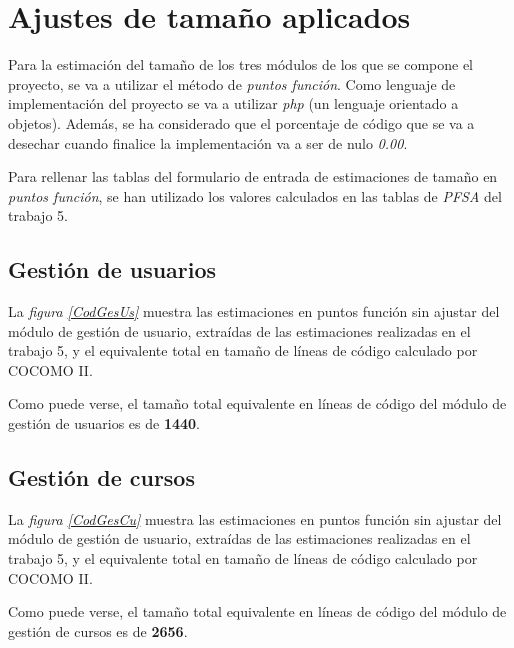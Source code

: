 \documentclass[11pt,a4paper,spanish,twoside]{book}
\begin{document}
\tableofcontents
\listoffigures

\chapter{Ajustes de tamaño aplicados}

Para la estimación del tamaño de los tres módulos de los que se compone el
proyecto, se va a utilizar el método de \emph{puntos función}. Como lenguaje
de implementación del proyecto se va a utilizar \emph{php} (un lenguaje
orientado a objetos). Además, se ha considerado que el porcentaje de código que
se va a desechar cuando finalice la implementación va a ser de nulo
\emph{0.00}.

Para rellenar las tablas del formulario de entrada de estimaciones de tamaño
en \emph{puntos función}, se han utilizado los valores calculados en las tablas
de \emph{PFSA} del trabajo 5.

\section{Gestión de usuarios}
La \emph{figura \ref{CodGesUs}} muestra las estimaciones en puntos función sin
ajustar del módulo de gestión de usuario, extraídas de las estimaciones
realizadas en el trabajo 5, y el equivalente total en tamaño de líneas de
código calculado por COCOMO II.


Como puede verse, el tamaño total equivalente en líneas de código del módulo
de gestión de usuarios es de \textbf{1440}.

\section{Gestión de cursos}
La \emph{figura \ref{CodGesCu}} muestra las estimaciones en puntos función sin
ajustar del módulo de gestión de usuario, extraídas de las estimaciones
realizadas en el trabajo 5, y el equivalente total en tamaño de líneas de
código calculado por COCOMO II.


Como puede verse, el tamaño total equivalente en líneas de código del módulo
de gestión de cursos es de \textbf{2656}.
\end{document}
